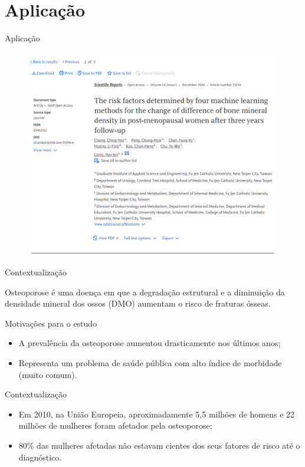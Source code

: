 \section{Aplicação}

\begin{frame}{Aplicação}
	\begin{figure}[h]
		\includegraphics[scale=0.3]{imagens//secao3/artigo2.png}
	\end{figure}
\end{frame}

\begin{frame}{Contextualização}
	\begin{block}{Osteoporose}
		é uma doença em que a degradação estrutural e a diminuição da densidade mineral dos ossos (DMO) aumentam o risco de fraturas ósseas.
	\end{block}
	\pause
	\begin{block}{Motivações para o estudo}
		\begin{itemize}
			\item  A prevalência da osteoporose aumentou drasticamente nos últimos anos;
			\item  Representa um problema de saúde pública com alto índice de morbidade (muito comum).
		\end{itemize}
	\end{block}
\end{frame}

\begin{frame}{Contextualização}
	\begin{block}{}
		\begin{itemize}
			\item Em 2010, na União Europeia, aproximadamente 5,5 milhões de homens e 22 milhões de mulheres foram afetados pela osteoporose;
			\item 80\% das mulheres afetadas não estavam cientes dos seus fatores de risco até o diagnóstico.
		\end{itemize}
	\end{block}
\end{frame}

